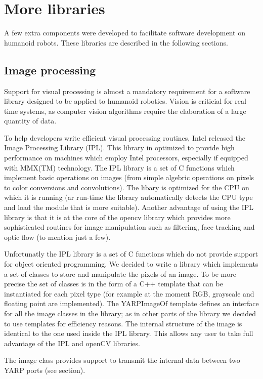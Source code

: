 \section{More libraries}
A few extra components were developed to facilitate software development on humanoid robots. These libraries are described in the following sections.

\subsection{Image processing}
Support for visual processing is almost a mandatory requirement for a software library designed to be applied to humanoid robotics. Vision is criticial for real time systems, as computer vision algorithms require the elaboration of a large quantity of data.

To help developers write efficient visual processing routines, Intel released the Image Processing Library (IPL). This library in optimized to provide high performance on machines which employ Intel processors, especially if equipped with MMX(TM) technology. The IPL library is a set of C functions which implement basic operations on images (from simple algebric operations on pixels to color conversions and convolutions). The libary is optimized for the CPU on which it is running (ar run-time the library automatically detects the CPU type and load the module that is more suitable). Another advantage of using the IPL library is that it is at the core of the opencv library which provides more sophisticated routines for image manipulation such as filtering, face tracking and optic flow (to mention just a few).

Unfortunatly the IPL library is a set of C functions which do not provide support for object oriented programming. We decided to write a library which implements a set of classes to store and manipulate the pixels of an image. To be more precise the set of classes is in the form of a C++ template that can be instantiated for each pixel type (for example at the moment RGB, grayscale and floating point are implemented). The YARPImageOf template defines an interface for all the image classes in the library; as in other parts of the library we decided to use templates for efficiency reasons. The internal structure of the image is identical to the one used inside the IPL library. This allows any user to take full advantage of the IPL and openCV libraries.

The image class provides support to transmit the internal data between two YARP ports (see section).

